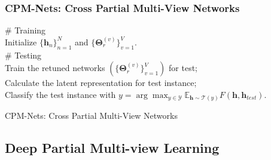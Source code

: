 \documentclass[notheorems, aspectratio=54]{beamer}
\begin{document}
\begin{frame} \frametitle{CPM-Nets: Cross Partial Multi-View Networks}

\begin{algorithm}[H]
\small
  \# Training \\
        Initialize $\{\mathbf{h}_n\}_{n=1}^N$ and $\{\boldsymbol{\Theta}_r^{(v)}\}_{v=1}^V$. \\
  \# Testing \\
    Train the retuned networks $(\{\boldsymbol{\Theta}_r^{(v)}\}_{v=1}^V)$ for test;  \\
    Calculate the latent representation for test instance; \\
    Classify the test instance with $y=\arg\max_{y\in\mathcal{Y}}\mathbb{E}_{\mathbf{h}\sim\mathcal{T}(y)}F(\mathbf{h}, \mathbf{h}_{test})$.
\caption{CPM-Nets: Cross Partial Multi-View Networks}
\label{alg:cpm_nets}
\end{algorithm}


\end{frame}


\subsection{Deep Partial Multi-view Learning}
\end{document}
